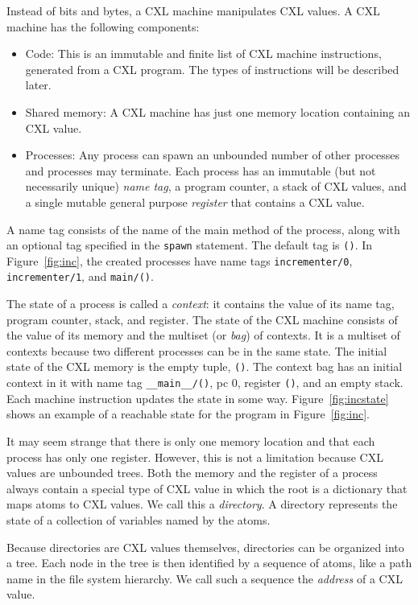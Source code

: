 \documentclass{report}
\begin{document}
Instead of bits and bytes, a CXL machine manipulates CXL values.
A CXL machine has the following components:
\begin{itemize}
\item Code:  This is an immutable and finite list of CXL machine instructions,
generated from a CXL program.  The types of instructions will be described later.
\item Shared memory: A CXL machine has just one memory location containing
an CXL value.
\item Processes:  Any process
can spawn an unbounded number of other processes and processes may terminate.
Each process has an immutable (but not necessarily unique) \emph{name tag},
a program counter, a stack of CXL values,
and a single mutable general purpose \emph{register} that contains a CXL value.
\end{itemize}

A name tag consists of the name of the main method of the process,
along with an optional tag specified in the \texttt{spawn} statement.
The default tag is \texttt{()}.
In Figure~\ref{fig:inc}, the created processes have name tags
\texttt{incrementer/0}, \texttt{incrementer/1}, and \texttt{main/()}.

The state of a process is called a \emph{context}: it contains the value of
its name tag, program counter, stack, and register.
The state of the CXL machine
consists of the value of its memory and the multiset (or \emph{bag}) of
contexts.  It is a multiset of contexts because two different processes can
be in the same state.
The initial state of the CXL memory is the empty tuple, \texttt{()}.
The context bag has an initial context in it with name tag
\texttt{\_\_main\_\_/()}, pc 0, register \texttt{()}, and an empty stack.
Each machine instruction updates the state in some way.
Figure~\ref{fig:incstate} shows an example of a reachable state for 
the program in Figure~\ref{fig:inc}.


It may seem strange that there is only one memory location and that each
process has only one register.  However, this is not a limitation because
CXL values are unbounded trees.
Both the memory and the register of a process always contain
a special type of CXL value in which the root is a dictionary
that maps atoms to CXL values.  We call this a \emph{directory}.
A directory represents the state of a collection of variables named by the atoms.

Because directories are CXL values themselves,
directories can be organized into a tree.
Each node in the tree is then identified
by a sequence of atoms, like a path name in the file system hierarchy.  We call
such a sequence the \emph{address} of a CXL value.
\end{document}
